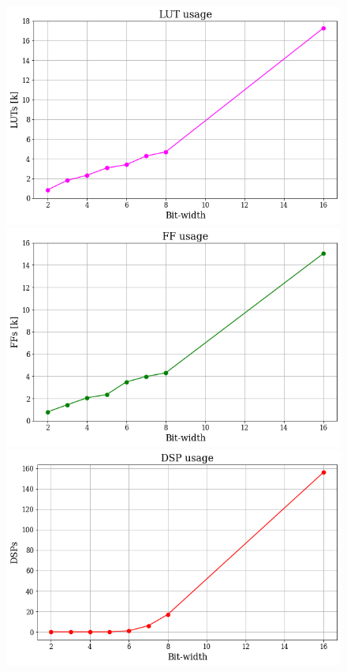 \documentclass[../../main.tex]{subfiles}
\begin{document}
\begin{figure}[ht] 
  \label{ fig7} 
  \begin{minipage}[b]{0.5\linewidth}
    \centering
    \includegraphics[width=.95\linewidth]{sections/05/Images/Quant_LUT_1ele.png} 
    \vspace{2ex}
  \end{minipage}%
  \begin{minipage}[b]{0.5\linewidth}
    \centering
    \includegraphics[width=.95\linewidth]{sections/05/Images/Quant_FF_1ele.png}
    \vspace{2ex}
  \end{minipage} 
  \begin{minipage}[b]{0.5\linewidth}
    \centering
    \includegraphics[width=.95\linewidth]{sections/05/Images/Quant_DSP_1ele.png} 

\end{minipage}
\end{figure}
\end{document}
